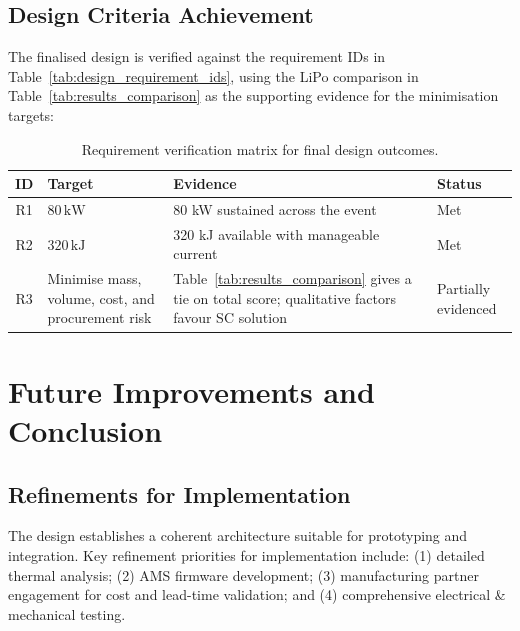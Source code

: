 \documentclass[11pt, a4paper]{report}
\numberwithin{equation}{section}
\begin{document}
\subsection{Design Criteria Achievement}
\label{sec:design_criteria_achievement}
The finalised design is verified against the requirement IDs in Table~\ref{tab:design_requirement_ids}, using the LiPo comparison in Table~\ref{tab:results_comparison} as the supporting evidence for the minimisation targets:

\begin{table}[htbp]
    \centering
    \caption{Requirement verification matrix for final design outcomes.}
    \label{tab:design_verification_matrix}
    \footnotesize
    \setlength{\tabcolsep}{4pt}
    \renewcommand{\arraystretch}{0.95}
    \begin{tabular}{|c|p{5cm}|p{7.5cm}|p{2cm}|}
        \hline
        \textbf{ID} & \textbf{Target} & \textbf{Evidence} & \textbf{Status} \\
        \hline
        R1 & $80\,\text{kW}$ & 80 kW sustained across the event & Met \\
        R2 & $320\,\text{kJ}$ & 320 kJ available with manageable current & Met \\
        R3 & Minimise mass, volume, cost, and procurement risk & Table~\ref{tab:results_comparison} gives a tie on total score; qualitative factors favour SC solution & Partially evidenced \\
        \hline
    \end{tabular}
\end{table}


\section{Future Improvements and Conclusion}

\subsection{Refinements for Implementation}
The design establishes a coherent architecture suitable for prototyping and integration. Key refinement priorities for implementation include: (1) detailed thermal analysis; (2) AMS firmware development; (3) manufacturing partner engagement for cost and lead-time validation; and (4) comprehensive electrical \& mechanical testing.
\end{document}
